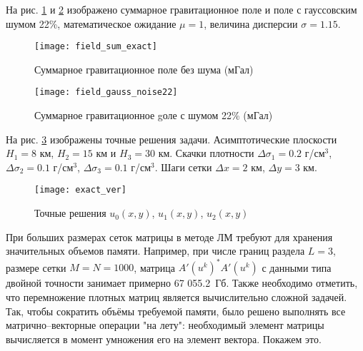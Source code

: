 На рис. \ref{fig:field_sum_exact} и \ref{fig:field_gauss_noise22} изображено суммарное гравитационное поле и поле с гауссовским шумом 22\%, математическое ожидание $\mu=1$, величина дисперсии $\sigma=1.15$. 
\begin{figure}[H]
	\centering
	\texttt{[image: field\_sum\_exact]}
	\caption{Суммарное гравитационное поле без шума (мГал)}
	\label{fig:field_sum_exact}
\end{figure}
\begin{figure}[H]
	\centering
	\texttt{[image: field\_gauss\_noise22]}
	\caption{Суммарное гравитационное gоле с шумом 22\% (мГал)}
	\label{fig:field_gauss_noise22}
\end{figure}

На рис. \ref{fig:exact_ver} изображены точные решения задачи. Асимптотические плоскости $H_1=8$ км, $H_2=15$ км и $H_3=30$ км. Скачки плотности $\Delta\sigma_1=0.2$ г/см$^3$, $\Delta\sigma_2=0.1$ г/см$^3$, $\Delta\sigma_3=0.1$ г/см$^3$. Шаги сетки $\Delta x=2$ км, $\Delta y=3$ км.
\begin{figure}[H]
	\centering
	\texttt{[image: exact\_ver]}
	\caption{Точные решения $u_0(x,y)$, $u_1(x,y)$, $u_2(x,y)$}
	\label{fig:exact_ver}
\end{figure}

При больших размерах сеток матрицы в методе ЛМ требуют для хранения значительных объемов памяти. Например, при числе границ раздела $L=3$, размере сетки $M=N=1000$, матрица $A'(u^k)^*A'(u^k)$ с данными типа двойной точности занимает примерно  67 055.2~Гб. Также необходимо отметить, что перемножение плотных матриц является вычислительно сложной задачей. Так, чтобы сократить объёмы требуемой памяти, было решено выполнять все матрично--векторные операции "на лету": необходимый элемент матрицы вычисляется в момент умножения его на элемент вектора. Покажем это.

